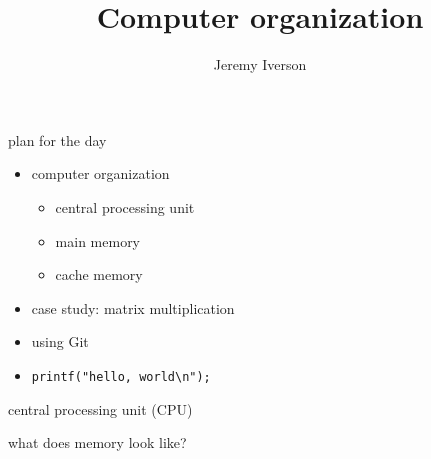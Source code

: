 \documentclass[10pt, t]{beamer}
\title{Computer organization}
\date{}
\author{Jeremy Iverson}
\institute{College of Saint Benedict \& Saint John's University}
\begin{document}
  \maketitle

  \begin{frame}{plan for the day}
    \begin{itemize}
      \item computer organization
        \begin{itemize}
          \item central processing unit
          \item main memory
          \item cache memory
        \end{itemize}
      \item case study: matrix multiplication
      \item using Git
      \item \texttt{printf("hello, world\textbackslash n");}
    \end{itemize}
  \end{frame}

  \begin{frame}[standout]
    central processing unit (CPU)

  \end{frame}

  \begin{frame}[standout]
    what does memory look like?

  \end{frame}
\end{document}
